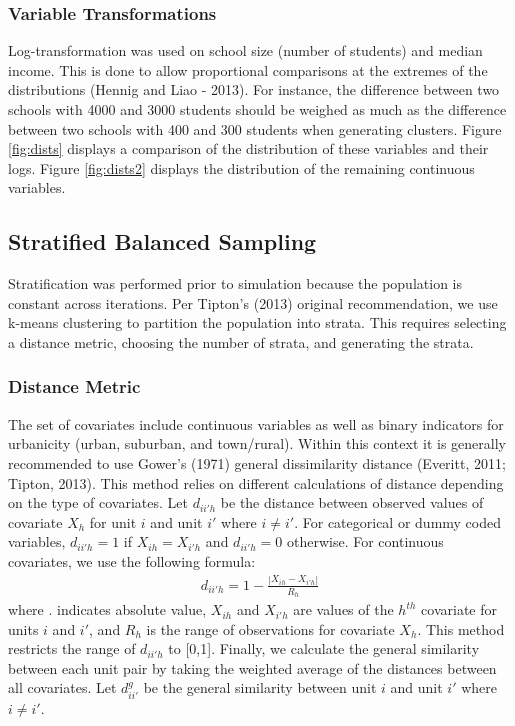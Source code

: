 \documentclass[man]{apa6}
\begin{document}
\hypertarget{variable-transformations}{%
\subsubsection{Variable Transformations}\label{variable-transformations}}

Log-transformation was used on school size (number of students) and median income. This is done to allow proportional comparisons at the extremes of the distributions (Hennig and Liao - 2013). For instance, the difference between two schools with 4000 and 3000 students should be weighed as much as the difference between two schools with 400 and 300 students when generating clusters. Figure \ref{fig:dists} displays a comparison of the distribution of these variables and their logs. Figure \ref{fig:dists2} displays the distribution of the remaining continuous variables.

\hypertarget{stratified-balanced-sampling}{%
\subsection{Stratified Balanced Sampling}\label{stratified-balanced-sampling}}

Stratification was performed prior to simulation because the population is constant across iterations. Per Tipton's (2013) original recommendation, we use k-means clustering to partition the population into strata. This requires selecting a distance metric, choosing the number of strata, and generating the strata.

\hypertarget{distance-metric-1}{%
\subsubsection{Distance Metric}\label{distance-metric-1}}

The set of covariates include continuous variables as well as binary indicators for urbanicity (urban, suburban, and town/rural). Within this context it is generally recommended to use Gower's (1971) general dissimilarity distance (Everitt, 2011; Tipton, 2013). This method relies on different calculations of distance depending on the type of covariates. Let \(d_{ii'h}\) be the distance between observed values of covariate \(X_{h}\) for unit \(i\) and unit \(i'\) where \(i \ne i'\). For categorical or dummy coded variables, \(d_{ii'h} = 1\) if \(X_{ih} = X_{i'h}\) and \(d_{ii'h} = 0\) otherwise. For continuous covariates, we use the following formula:
\begin{align}
  d_{ii'h} = 1 - \frac{|X_{ih} - X_{i'h}|}{R_h}
\end{align}
where \textbar{}.\textbar{} indicates absolute value, \(X_{ih}\) and \(X_{i'h}\) are values of the \(h^{th}\) covariate for units \(i\) and \(i'\), and \(R_h\) is the range of observations for covariate \(X_h\). This method restricts the range of \(d_{ii'h}\) to {[}0,1{]}. Finally, we calculate the general similarity between each unit pair by taking the weighted average of the distances between all covariates. Let \(d^{g}_{ii'}\) be the general similarity between unit \(i\) and unit \(i'\) where \(i \ne i'\).
\end{document}
